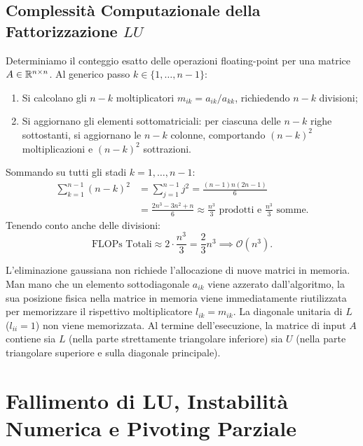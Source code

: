\subsection{Complessit\`a Computazionale della Fattorizzazione $LU$}
Determiniamo il conteggio esatto delle operazioni floating-point per una matrice $A \in \mathbb{R}^{n \times n}$.
Al generico passo $k \in \{1, \dots, n-1\}$:
\begin{enumerate}
    \item Si calcolano gli $n - k$ moltiplicatori $m_{ik} = a_{ik}/a_{kk}$, richiedendo $n - k$ divisioni;
    \item Si aggiornano gli elementi sottomatriciali: per ciascuna delle $n - k$ righe sottostanti, si aggiornano le $n - k$ colonne, comportando $(n - k)^2$ moltiplicazioni e $(n - k)^2$ sottrazioni.
\end{enumerate}
Sommando su tutti gli stadi $k = 1, \dots, n-1$:
\begin{equation}
\begin{aligned}
    \sum_{k=1}^{n-1} (n - k)^2 &= \sum_{j=1}^{n-1} j^2 = \frac{(n-1)n(2n-1)}{6} \\
    &= \frac{2n^3 - 3n^2 + n}{6} \approx \frac{n^3}{3} \text{ prodotti e } \frac{n^3}{3} \text{ somme.}
\end{aligned}
\end{equation}
Tenendo conto anche delle divisioni:
\begin{equation}
    \text{FLOPs Totali} \approx 2 \cdot \frac{n^3}{3} = \frac{2}{3} n^3 \implies \mathcal{O}(n^3).
\end{equation}

\begin{property}
L'eliminazione gaussiana non richiede l'allocazione di nuove matrici in memoria. Man mano che un elemento sottodiagonale $a_{ik}$ viene azzerato dall'algoritmo, la sua posizione fisica nella matrice in memoria viene immediatamente riutilizzata per memorizzare il rispettivo moltiplicatore $l_{ik} = m_{ik}$. La diagonale unitaria di $L$ ($l_{ii} = 1$) non viene memorizzata. Al termine dell'esecuzione, la matrice di input $A$ contiene sia $L$ (nella parte strettamente triangolare inferiore) sia $U$ (nella parte triangolare superiore e sulla diagonale principale).
\end{property}

\FloatBarrier
\section{Fallimento di LU, Instabilit\`a Numerica e Pivoting Parziale}
\label{sec:fallimento-instabilita-pivoting}

